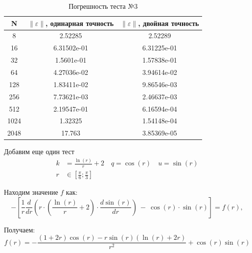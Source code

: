   \begin{table}[H]
    \centering
    \begin{tabular}{c | c | c}
      \toprule
      N & $ \left\lVert \varepsilon \right\rVert  $, одинарная точность & $ \left\lVert \varepsilon \right\rVert  $, двойная точность \\
      \midrule
      8 & 2.52285 & 2.52289\\
      16 & 6.31502e-01 & 6.31225e-01\\
      32 & 1.5601e-01 & 1.57838e-01\\
      64 & 4.27036e-02 & 3.94614e-02\\
      128 & 1.83411e-02 & 9.86546e-03\\
      256 & 7.73621e-03 & 2.46637e-03\\
      512 & 2.19547e-01 & 6.16594e-04\\
      1024 & 1.32325 & 1.54148e-04\\
      2048 & 17.763 & 3.85369e-05\\
      \bottomrule
    \end{tabular}
    \caption{Погрешность теста №3}
  \end{table}

  Добавим еще один тест
  \begin{align*}
    k &= \frac{\ln(r)}{r} + 2 \quad q = \cos(r) \quad u = \sin(r) \\
    r &\in [\frac{\pi}{6}; \frac{\pi}{3} ]
  \end{align*}

  Находим значение $f$ как:
  \[
    -\left[ \frac{1}{r} \frac{d}{dr} \left(r \cdot (\frac{\ln(r)}{r} + 2 ) \cdot \frac{d \sin(r)}{dr} \right)\ -\ \cos(r) \cdot \sin(r) \right] = f(r),
  \]

  Получаем:
  \[
    f(r) = -\frac{(1+2r) \cos(r) - r \sin(r) (\ln(r) + 2r)}{r^2} + \cos(r)\sin(r)
  \]

